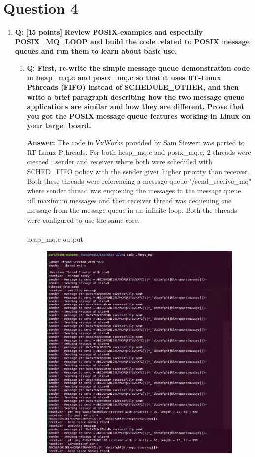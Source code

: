 \documentclass[a4paper,11pt]{article}%
\newenvironment{qanda}{\setlength{\parindent}{0pt}}{\bigskip}
\newcommand{\Q}{\bigskip\bfseries Q: }
\newcommand{\A}{\par\textbf{Answer: } \normalfont}
\begin{document}
\begin{qanda}
\begin{enumerate}
	\end{enumerate}

	\pagebreak
	\section{Question 4}
	\begin{enumerate}
		\item[] \Q [15 points] Review POSIX-examples and especially POSIX\_MQ\_LOOP and build the code
			related to POSIX message queues and run them to learn about basic use.
			\begin{enumerate}
				\item \Q  First, re-write the simple message queue demonstration code in heap\_mq.c and
				      posix\_mq.c so that it uses RT-Linux Pthreads (FIFO) instead of SCHEDULE\_OTHER,
				      and then write a brief paragraph describing how the two message queue applications are
				      similar and how they are different. Prove that you got the POSIX message queue features
				      working in Linux on your target board.
				      \A The code in VxWorks provided by Sam Siewert was ported to RT-Linux Pthreads. For both heap\_mq.c and posix\_mq.c, 2 threads were created : sender and receiver where both were scheduled with SCHED\_FIFO policy with the sender given higher priority than receiver. Both these threads were referencing a message queue "/send\_receive\_mq" where sender thread was enqueuing the messages in the message queue till maximum messages and then receiver thread was dequeuing one message from the message queue in an infinite loop. Both the threads were configured to use the same core.\\\\
				      heap\_mq.c output
					  \begin{figure}[H]
						\centering
						\includegraphics[scale=0.6]{figures/heapmq.png}

\end{figure}
\end{enumerate}
\end{enumerate}
\end{qanda}
\end{document}
